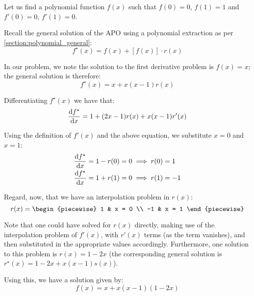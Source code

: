\begin{example}
    Let us find a polynomial function $f(x)$ such that $f(0)=0$, $f(1)=1$ and $f'(0)=0$, $f'(1)=0$.

    Recall the general solution of the APO using a polynomial extraction as per \ref{section:polynomial_general}:
    $$
        f^\star(x) = f(x) + [f(x)]\cdot r(x)
    $$

    In our problem, we note the solution to the first derivative problem is $f(x)=x$; the general solution is therefore:
    $$
        f^\star(x) = x + x(x-1)r(x)
    $$

    Differentiating $f^\star(x)$ we have that:
    $$
        \dv{f^\star}{x} = 1 + (2x-1)r(x) + x(x-1)r'(x)
    $$

    Using the definition of $f'(x)$ and the above equation, we substitute $x=0$ and $x=1$:
    \begin{align*}
        \dv{f^\star}{x}(0) = 1-r(0) &= 0 \implies r(0) =1 \\
        \dv{f^\star}{x}(1) = 1+r(1) &= 0 \implies r(1) =-1
    \end{align*}

    Regard, now, that we have an interpolation problem in $r(x)$:
    $$
        r(x) = \begin{piecewise}
            1 & x = 0 \\
            -1 & x = 1
        \end{piecewise}
    $$

    Note that one could have solved for $r(x)$ directly, making use of the interpolation problem of $f'(x)$, with $r'(x)$ terms (as the term vanishes), and then substituted in the appropriate values accordingly. Furthermore, one solution to this problem is $r(x)=1-2x$ (the corresponding general solution is $r^\star(x)=1-2x+x(x-1)s(x)$).

    Using this, we have a solution given by:
    $$
        f(x) = x + x(x-1)(1-2x)
    $$
\end{example}

